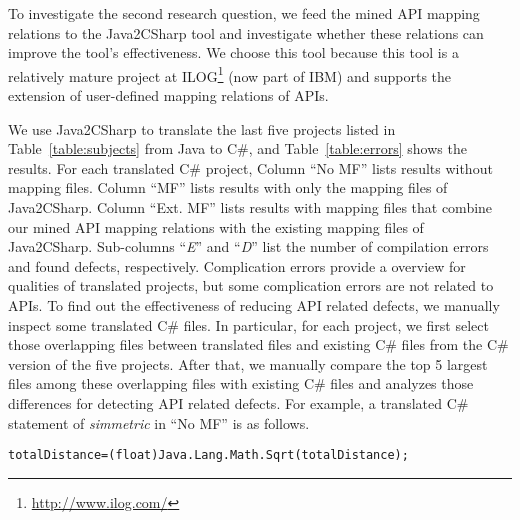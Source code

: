 To investigate the second research question, we feed the
mined API mapping relations to the Java2CSharp tool and
investigate whether these relations can improve the tool's
effectiveness. We choose this tool because this tool is a relatively
mature project at ILOG\footnote{\url{http://www.ilog.com/}} (now
part of IBM) and supports the extension of user-defined mapping
relations of APIs.

We use Java2CSharp to translate the last five projects listed in
Table~\ref{table:subjects} from Java to C\#, and
Table~\ref{table:errors} shows the results. For each translated C\#
project, Column ``No MF'' lists results without mapping files.
Column ``MF'' lists results with only the mapping files of Java2CSharp.
Column ``Ext. MF'' lists results with mapping files that combine
our mined API mapping relations with the existing mapping files of Java2CSharp.
Sub-columns ``\emph{E}'' and ``\emph{D}'' list the number of
compilation errors and found defects, respectively. Complication errors provide a overview for qualities of translated projects, but some complication errors are not related to APIs.
To find out the effectiveness of reducing API related defects, we manually inspect some translated C\# files. In particular, for each project,
we first select those overlapping files between translated files and existing C\# files
from the C\# version of the five projects. After that, we manually compare
the top 5 largest files among these overlapping files with existing C\# files and analyzes those differences for detecting API related defects. For example, a translated C\# statement of \emph{simmetric} in ``No MF'' is as follows.

\begin{CodeOut}\vspace*{-1.8ex}
\begin{alltt}
 totalDistance = (float)Java.Lang.Math.Sqrt(totalDistance);
\end{alltt}
\end{CodeOut}\vspace*{-1.8ex}


